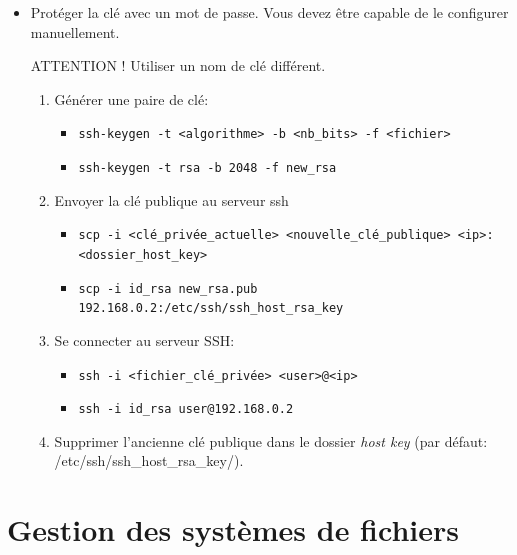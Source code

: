 \documentclass[a4paper]{article}
\begin{document}
\begin{itemize}
\item Protéger la clé avec un mot de passe. Vous devez être capable de le configurer manuellement.
\begin{example}
    ATTENTION ! Utiliser un nom de clé différent.
    \begin{enumerate}
        \item Générer une paire de clé:
        \begin{itemize}
            \item \texttt{ssh-keygen -t <algorithme> -b <nb\_bits> -f <fichier>}
            \item \texttt{ssh-keygen -t rsa -b 2048 -f new\_rsa}
        \end{itemize}
        \item Envoyer la clé publique au serveur ssh
        \begin{itemize}
            \item \texttt{scp -i <clé\_privée\_actuelle> <nouvelle\_clé\_publique> <ip>:<dossier\_host\_key>}
            \item \texttt{scp -i id\_rsa new\_rsa.pub 192.168.0.2:/etc/ssh/ssh\_host\_rsa\_key}
        \end{itemize}
        \item Se connecter au serveur SSH:
        \begin{itemize}
            \item \texttt{ssh -i <fichier\_clé\_privée> <user>@<ip>}
            \item \texttt{ssh -i id\_rsa user@192.168.0.2}
        \end{itemize}
        \item Supprimer l'ancienne clé publique dans le dossier \textit{host key} (par défaut: /etc/ssh/ssh\_host\_rsa\_key/).
    \end{enumerate}
\end{example}

\end{itemize}















\section{Gestion des systèmes de fichiers}
\end{document}
